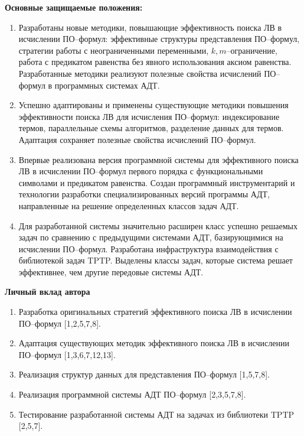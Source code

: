 \documentclass[a4paper]{report}
\begin{document}
\textbf{Основные защищаемые положения:}
\begin{enumerate}
\item Разработаны новые методики, повышающие эффективность поиска ЛВ в исчислении ПО--формул: эффективные структуры представления ПО--формул, стратегии работы с неограниченными переменными, $k,m$--огра\-ни\-че\-ние, работа с предикатом равенства без явного использования аксиом равенства. Разработанные методики реализуют полезные свойства исчислений ПО--формул в программных системах АДТ.

\item Успешно адаптированы и применены существующие методики повышения эффективности поиска ЛВ для исчисления ПО--формул: индексирование термов, параллельные схемы алгоритмов, разделение данных для термов. Адаптация сохраняет полезные свойства исчислений ПО--формул.

\item Впервые реализована версия программной системы для эффективного поиска ЛВ в исчислении ПО--формул первого порядка с функциональными символами и предикатом равенства. Создан программный инструментарий и технологии разработки специализированных версий программы АДТ, направленные на решение определенных классов задач АДТ.

\item Для разработанной системы значительно расширен класс успешно решаемых задач по сравнению с предыдущими системами АДТ, базирующимися на исчислении ПО--формул. Разработана инфраструктура взаимодействия с библиотекой задач TPTP. Выделены классы задач, которые система решает эффективнее, чем другие передовые системы АДТ.
\end{enumerate}


\textbf{Личный вклад автора}
\begin{enumerate}
\item Разработка оригинальных стратегий эффективного поиска ЛВ в исчислении ПО--формул [1,2,5,7,8].
\item Адаптация существующих методик эффективного поиска ЛВ в исчислении ПО--формул [1,3,6,7,12,13].
\item Реализация структур данных для представления ПО--формул [1,5,7,8].
\item Реализация программной системы АДТ ПО--формул [2,3,5,7,8].
\item Тестирование разработанной системы АДТ на задачах из библиотеки TPTP [2,5,7].
\end{enumerate}
\end{document}
